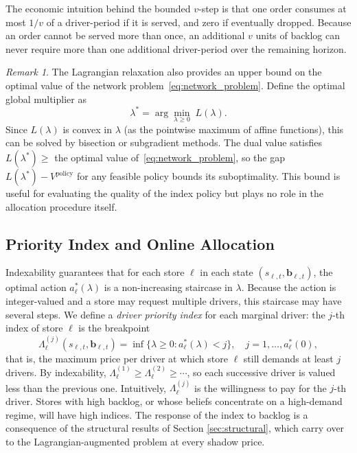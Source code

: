 \documentclass[preprint,11pt,authoryear]{elsarticle}
\newcommand{\bvec}[1]{\mathbf{#1}}
\theoremstyle{remark}
\newtheorem{remark}{Remark}
\begin{document}
The economic intuition behind the bounded $v$-step is that one order consumes at most $1/v$ of a driver-period if it is served, and zero if eventually dropped. Because an order cannot be served more than once, an additional $v$ units of backlog can never require more than one additional driver-period over the remaining horizon.

\begin{remark}
The Lagrangian relaxation also provides an upper bound on the optimal value of the network problem~\eqref{eq:network_problem}. Define the optimal global multiplier as
\begin{equation}
    \lambda^* = \arg\min_{\lambda \geq 0} \; L(\lambda).
    \label{eq:dual}
\end{equation}
Since $L(\lambda)$ is convex in $\lambda$ (as the pointwise maximum of affine functions), this can be solved by bisection or subgradient methods. The dual value satisfies $L(\lambda^*) \geq$ the optimal value of~\eqref{eq:network_problem}, so the gap $L(\lambda^*) - V^{\text{policy}}$ for any feasible policy bounds its suboptimality. This bound is useful for evaluating the quality of the index policy but plays no role in the allocation procedure itself.
\end{remark}

\subsection{Priority Index and Online Allocation}

Indexability guarantees that for each store $\ell$ in each state $(s_{\ell,t}, \bvec{b}_{\ell,t})$, the optimal action $a^*_\ell(\lambda)$ is a non-increasing staircase in $\lambda$. Because the action is integer-valued and a store may request multiple drivers, this staircase may have several steps. We define a \emph{driver priority index} for each marginal driver: the $j$-th index of store $\ell$ is the breakpoint
\begin{equation}
    \Lambda_\ell^{(j)}(s_{\ell,t}, \bvec{b}_{\ell,t}) = \inf\bigl\{\lambda \geq 0 : a^*_\ell(\lambda) < j\bigr\}, \quad j = 1, \ldots, a^*_\ell(0),
    \label{eq:index}
\end{equation}
that is, the maximum price per driver at which store $\ell$ still demands at least $j$ drivers. By indexability, $\Lambda_\ell^{(1)} \geq \Lambda_\ell^{(2)} \geq \cdots$, so each successive driver is valued less than the previous one. Intuitively, $\Lambda_\ell^{(j)}$ is the willingness to pay for the $j$-th driver. Stores with high backlog, or whose beliefs concentrate on a high-demand regime, will have high indices. The response of the index to backlog is a consequence of the structural results of Section \ref{sec:structural}, which carry over to the Lagrangian-augmented problem at every shadow price.
\end{document}
